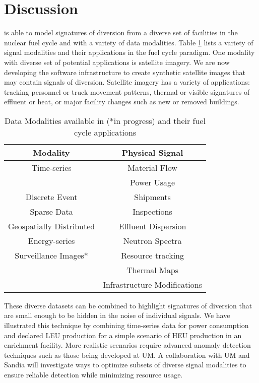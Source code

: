 \section{Discussion}
\label{s_dis}

\Cyclus is able to model signatures of diversion from a diverse set of facilities in the nuclear fuel cycle and with a variety of data modalities. Table \ref{tab:modalities} lists a variety of signal modalities and their applications in the fuel cycle paradigm.  One modality with diverse set of potential applications is satellite imagery.  We are now developing the software infrastructure to create synthetic satellite images that may contain signals of diversion. Satellite imagery has a variety of applications: tracking personnel or truck movement patterns, thermal or visible signatures of effluent or heat, or major facility changes such as new or removed buildings.

\begin{table}
\centering
\begin{tabular}{|c|c|}
\hline
\textbf{Modality}        & \textbf{Physical Signal} \\
\hline
Time-series              & Material Flow \\
                         & Power Usage \\
\hline
Discrete Event           & Shipments \\
\hline
Sparse Data              & Inspections \\
\hline
Geospatially Distributed & Effluent Dispersion  \\
\hline
Energy-series            & Neutron Spectra \\
\hline
Surveillance Images*     & Resource tracking \\
                         & Thermal Maps  \\
                         & Infrastructure Modifications \\
\hline
\end{tabular}
\caption{Data Modalities available in \Cyclus (*in progress) and their fuel cycle applications}
\label{tab:modalities}
\end{table}

These diverse datasets can be combined to highlight signatures of diversion that are small enough to be hidden in the noise of individual signals.  We have illustrated this technique by combining time-series data for power consumption and declared \gls{LEU} production for a simple scenario of \gls{HEU} production in an enrichment facility.  More realistic scenarios require advanced anomaly detection techniques such as those being developed at \gls{UM}. A collaboration with \gls{UM} and \gls{Sandia} will investigate ways to optimize subsets of diverse signal modalities to ensure reliable detection while minimizing resource usage.


